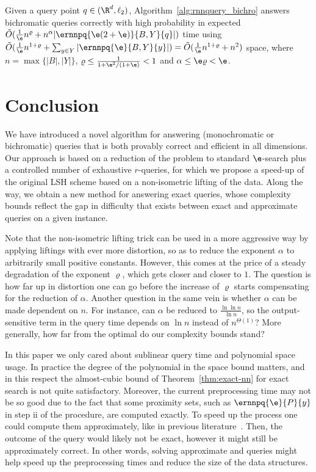 \addtocounter{thm}{-1}
\begin{thm}[case $s=2$]\label{thm:rnnquery_bichro_l2}
Given a query point $q\in (\R^d, \ell_2)$,
Algorithm~\ref{alg:rnnquery_bichro} answers bichromatic \rnn queries
correctly with high probability in expected $\tilde O
(\frac{1}{\e}n^{\varrho} + n^\alpha |\ernnpq{\e(2+\e)}{B,Y}{q}|)$ time
using $\tilde O(\frac{1}{\e} n^{1+\varrho} + \sum_{y\in Y}
|\ernnpq{\e}{B,Y}{y}|) = \tilde O(\frac{1}{\e} n^{1+\varrho} + n^2)$
space, where $n=\max\{|B|, |Y|\}$, $\varrho\leq
\frac{1}{1+\e^2/(1+\e)}<1$ and $\alpha\leq\e\varrho<\e$.
\end{thm}


\section{Conclusion}


We have introduced a novel algorithm for answering (monochromatic or
bichromatic) \rnn queries that is both provably correct and 
efficient in all dimensions. Our approach is based on a reduction of
the problem to standard $\e$-\nn search plus a controlled number of
exhaustive $r$-\pleb queries, for which we propose a speed-up of the
original LSH scheme based on a non-isometric lifting of the
data. Along the way, we obtain a new method for answering exact \nn
queries, whose complexity bounds reflect the gap in difficulty that
exists between exact and approximate queries on a given instance.

Note that the non-isometric lifting trick can be used in a more
aggressive way by applying liftings with ever more distortion, so as
to reduce the exponent $\alpha$ to arbitrarily small positive
constants. However, this comes at the price of a steady degradation of
the exponent $\varrho$, which gets closer and closer to $1$. The
question is how far up in distortion one can go before the increase of
$\varrho$ starts compensating for the reduction of $\alpha$.  Another
question in the same vein is whether $\alpha$ can be made dependent on
$n$. For instance, can $\alpha$ be reduced to $\frac{\ln\ln n}{\ln
  n}$, so the output-sensitive term in the query time depends on $\ln
n$ instead of $n^{\Theta(1)}$?  More generally, how far from the
optimal do our complexity bounds stand?

In this paper we only cared about sublinear query time and polynomial
space usage. In practice the degree of the polynomial in the space
bound matters, and in this respect the almost-cubic bound of
Theorem~\ref{thm:exact-nn} for exact \nn search is not quite
satisfactory. Moreover, the current preprocessing time may not be so good
due to the fact that some proximity sets, such as $\ernnpq{\e}{P}{y}$
in step ii of the \rnn procedure, are computed
exactly. To speed up the process one could compute them approximately,
like in previous
literature~\cite{HarPeledIndykMotwani}. Then, the outcome of the
query would likely not be exact, however it might still be
approximately correct. In other words, solving approximate \nn and
\rnn queries might help speed up the preprocessing times and
reduce the size of the data structures.

